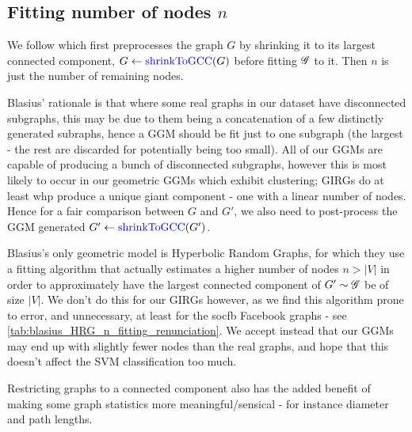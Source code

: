 \subsection{Fitting number of nodes $n$}

We follow \cite{blasius2018towards} which first preprocesses the graph $G$ by shrinking it to its largest connected component, $G \gets \operatorname{\textcolor{blue}{shrinkToGCC}}(G)$
before fitting $\mathscr{G}$ to it. Then $n$ is just the number of remaining nodes.



Blasius' rationale is that where some real graphs in our dataset have disconnected subgraphs, this may be due to them being a concatenation of a few distinctly generated subraphs, hence a GGM should be fit just to one subgraph (the largest - the rest are discarded for potentially being too small). All of our GGMs are capable of producing a bunch of disconnected subgraphs, however this is most likely to occur in our geometric GGMs which exhibit clustering; GIRGs do at least whp produce a unique giant component - one with a linear number of nodes. Hence for a fair comparison between $G$ and $G'$, we also need to post-process the GGM generated $G' \gets \operatorname{\textcolor{blue}{shrinkToGCC}}(G')$. 

Blasius's only geometric model is Hyperbolic Random Graphs, for which they use a fitting algorithm that actually estimates a higher number of nodes $n > |V|$ in order to approximately have the largest connected component of $G' \sim \mathscr{G}$ be of size $|V|$.
We don't do this for our GIRGs however, as we find this algorithm prone to error, and unnecessary, at least for the socfb Facebook graphs - see \cref{tab:blasius_HRG_n_fitting_renunciation}. We accept instead that our GGMs may end up with slightly fewer nodes than the real graphs, and hope that this doesn't affect the SVM classification too much.



Restricting graphs to a connected component also has the added benefit of making some graph statistics more meaningful/sensical - for instance diameter and path lengths.



